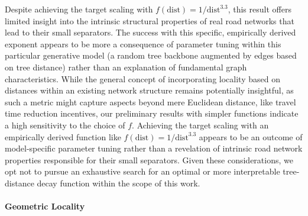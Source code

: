 Despite achieving the target scaling with \(f(\text{dist}) = 1/\text{dist}^{3.3}\), this result offers limited insight into the intrinsic structural properties of real road networks that lead to their small separators.
The success with this specific, empirically derived exponent appears to be more a consequence of parameter tuning within this particular generative model (a random tree backbone augmented by edges based on tree distance) rather than an explanation of fundamental graph characteristics.
While the general concept of incorporating locality based on distances within an existing network structure remains potentially insightful, as such a metric might capture aspects beyond mere Euclidean distance, like travel time reduction incentives, our preliminary results with simpler functions indicate a high sensitivity to the choice of \(f\).
Achieving the target  scaling with an empirically derived function like \(f(\text{dist}) = 1/\text{dist}^{3.3}\) appears to be an outcome of model-specific parameter tuning rather than a revelation of intrinsic road network properties responsible for their small separators.
Given these considerations, we opt not to pursue an exhaustive search for an optimal or more interpretable tree-distance decay function within the scope of this work.

\paragraph{Geometric Locality}

